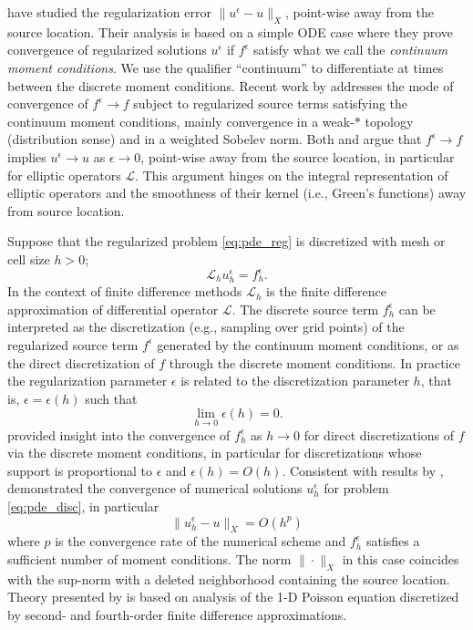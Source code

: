 \cite{TorEng:03} have studied the regularization error $\|u^\epsilon - u\|_X$, point-wise away from the source location.
Their analysis is based on a simple ODE case where they prove convergence of regularized solutions $u^\epsilon$ if $f^{\epsilon}$ satisfy what we call the {\em continuum moment conditions}. 
We use the qualifier ``continuum'' to differentiate at times between the discrete moment conditions.
Recent work by \cite{hoss:16} addresses the mode of convergence of $f^\epsilon\to f$ subject to regularized source terms satisfying the continuum moment conditions, mainly convergence in a weak-$*$ topology (distribution sense) and in a weighted Sobelev norm.
Both \cite{TorEng:03} and \cite{hoss:16} argue that $f^{\epsilon}\to f$ implies $u^\epsilon\to u$ as $\epsilon \to 0$, point-wise away from the source location, in particular for elliptic operators $\mathcal L$. 
This argument hinges on the integral representation of elliptic operators and the smoothness of their kernel (i.e., Green's functions) away from source location.

Suppose that the regularized problem \ref{eq:pde_reg} is discretized with mesh or cell size $h>0$;
\begin{equation}\label{eq:pde_disc}
	\mathcal L_h u^{\epsilon}_h = f^{\epsilon}_h.
\end{equation}
In the context of finite difference methods $\mathcal L_h$ is the finite difference approximation of differential operator $\mathcal L$.
The discrete source term $f^\epsilon_h$ can be interpreted as the discretization 
(e.g., sampling over grid points) of the regularized source term $f^\epsilon$  generated by the continuum moment conditions, or as the direct discretization of $f$ through the discrete moment conditions.
In practice the regularization parameter $\epsilon$ is related to the discretization parameter $h$, that is, $\epsilon = \epsilon(h)$ such that
\[
	\lim_{h\to 0} \epsilon(h) = 0.
\]
\cite{TorEng:04} provided insight into the convergence of $f^\epsilon_h$ as $h\to 0$ for direct discretizations of $f$ via the discrete moment conditions, in particular for discretizations whose support is proportional to $\epsilon$ and $\epsilon(h) = O(h)$.
Consistent with results by \cite{Walden:1999}, \cite{TorEng:04} demonstrated the convergence of numerical solutions $u^\epsilon_h$ for problem \ref{eq:pde_disc}, in particular
\[
	\| u^\epsilon_h - u\|_X = O(h^p)
\]
where $p$ is the convergence rate of the numerical scheme and $f^{\epsilon}_h$ satisfies a sufficient number of moment conditions. 
The norm $\|\cdot\|_X$ in this case coincides with the sup-norm with a deleted neighborhood containing the source location.
Theory presented by \cite{TorEng:04} is based on analysis of the 1-D Poisson equation discretized by second- and fourth-order finite difference approximations.%

